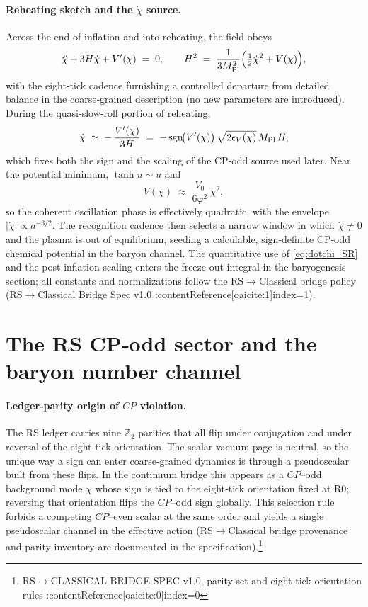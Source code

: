 \documentclass[11pt]{article}
\begin{document}
\paragraph{Reheating sketch and the \(\dot\chi\) source.}
Across the end of inflation and into reheating, the field obeys
\begin{equation}
  \ddot\chi + 3H\dot\chi + V'(\chi) \;=\; 0,
  \qquad
  H^2 \;=\; \frac{1}{3M_{\rm Pl}^2}\Big(\tfrac12\dot\chi^2 + V(\chi)\Big),
  \label{eq:KG}
\end{equation}
with the eight‑tick cadence furnishing a controlled departure from detailed balance in the coarse‑grained description (no new parameters are introduced). During the quasi‑slow‑roll portion of reheating,
\begin{equation}
  \dot\chi \;\simeq\; -\,\frac{V'(\chi)}{3H}
  \;=\; -\,{\rm sgn}\!\big(V'(\chi)\big)\,\sqrt{2\epsilon_V(\chi)}\,M_{\rm Pl}\,H,
  \label{eq:dotchi_SR}
\end{equation}
which fixes both the sign and the scaling of the CP‑odd source used later. Near the potential minimum, \(\tanh u \sim u\) and
\begin{equation}
  V(\chi) \;\approx\; \frac{V_0}{6\varphi^2}\,\chi^2,
\end{equation}
so the coherent oscillation phase is effectively quadratic, with the envelope \(|\dot\chi|\propto a^{-3/2}\). The recognition cadence then selects a narrow window in which \(\dot\chi\neq 0\) and the plasma is out of equilibrium, seeding a calculable, sign‑definite CP‑odd chemical potential in the baryon channel. The quantitative use of \eqref{eq:dotchi_SR} and the post‑inflation scaling enters the freeze‑out integral in the baryogenesis section; all constants and normalizations follow the RS\(\to\)Classical bridge policy (RS\(\to\)Classical Bridge Spec v1.0 :contentReference[oaicite:1]{index=1}).

\section{The RS CP‑odd sector and the baryon number channel}

\paragraph{Ledger‑parity origin of \(CP\) violation.}
The RS ledger carries nine \(\mathbb{Z}_2\) parities that all flip under conjugation and under reversal of the eight‑tick orientation. The scalar vacuum page is neutral, so the unique way a sign can enter coarse‑grained dynamics is through a pseudoscalar built from these flips. In the continuum bridge this appears as a \(CP\)–odd background mode \(\chi\) whose sign is tied to the eight‑tick orientation fixed at R0; reversing that orientation flips the \(CP\)–odd sign globally. This selection rule forbids a competing \(CP\)–even scalar at the same order and yields a single pseudoscalar channel in the effective action (RS\(\to\)Classical bridge provenance and parity inventory are documented in the specification).\footnote{RS\(\to\)CLASSICAL BRIDGE SPEC v1.0, parity set and eight‑tick orientation rules :contentReference[oaicite:0]{index=0}}
\end{document}
